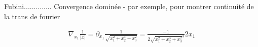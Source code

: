 Fubini..............
Convergence dominée - par exemple, pour montrer continuité
de la trans de fourier



\begin{align}
    \nabla_{x_1} \frac{1}{|x|} = \partial_{x_1} \frac{1}{\sqrt{x_1^2 + x_2^3 + x_3^2}}
    = \frac{-1}{2\sqrt{x_1^2 + x_2^3 + x_3^2}^3} 2 x_1
\end{align}













%
%
%
%
%
%
%
%
%
%
%
%
%








